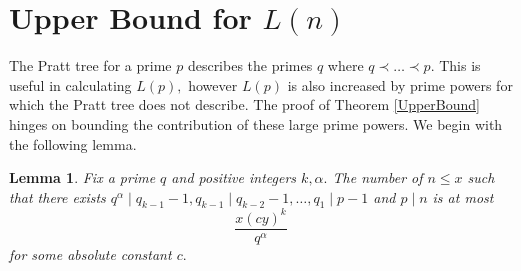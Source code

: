 \documentclass[12pt,regno]{amsart}
\newtheorem{lemma}[theorem]{Lemma}
\begin{document}
\section{Upper Bound for $L(n)$}

The Pratt tree for a prime $p$ describes the primes $q$ where $q \prec \dots \prec p.$ This is useful in calculating $L(p),$ however $L(p)$ is also increased by prime powers for which the Pratt tree does not describe. The proof of Theorem \ref{UpperBound} hinges on bounding the contribution of these large prime powers. We begin with the following lemma.

\begin{lemma}\label{cases}
Fix a prime $q$ and positive integers $k,\alpha.$ The number of $n \le x$ such that there exists $q^{\alpha} \mid q_{k-1}-1,q_{k-1} \mid q_{k-2}-1,\dots,q_1 \mid p-1$ and $p \mid n$ is at most $$\frac{x(cy)^k}{q^{\alpha}}$$ for some absolute constant $c.$
\end{lemma}
\end{document}
